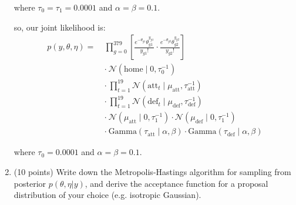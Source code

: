 \documentclass{article}
\begin{document}
\begin{enumerate}
    where $\tau_0 = \tau_1 = 0.0001$ and $\alpha = \beta = 0.1$.
    
   so, our joint likelihood is:
   \begin{align*}
    p(y, \theta, \eta) =\ & 
    \prod_{g=0}^{379} \left[ \frac{e^{-\theta_{g1}} \theta_{g1}^{y_{g1}}}{y_{g1}!} \cdot \frac{e^{-\theta_{g2}} \theta_{g2}^{y_{g2}}}{y_{g2}!} \right] \\
    & \cdot\ \mathcal{N}(\text{home} \mid 0, \tau_0^{-1}) \\
    & \cdot\ \prod_{t=1}^{19} \mathcal{N}(\text{att}_t \mid \mu_{\text{att}}, \tau_{\text{att}}^{-1}) \\
    & \cdot\ \prod_{t=1}^{19} \mathcal{N}(\text{def}_t \mid \mu_{\text{def}}, \tau_{\text{def}}^{-1}) \\
    & \cdot\ \mathcal{N}(\mu_{\text{att}} \mid 0, \tau_1^{-1}) \cdot \mathcal{N}(\mu_{\text{def}} \mid 0, \tau_1^{-1}) \\
    & \cdot\ \text{Gamma}(\tau_{\text{att}} \mid \alpha, \beta) \cdot \text{Gamma}(\tau_{\text{def}} \mid \alpha, \beta)
    \end{align*}
    
   where $\tau_0 = 0.0001$ and $\alpha = \beta = 0.1$.

\item (10 points) Write down the Metropolis-Hastings algorithm for sampling from posterior $p(\theta, \eta|y)$, and derive the acceptance function for a proposal distribution of your choice (e.g. isotropic Gaussian).



\end{enumerate}
\end{document}
